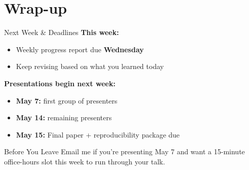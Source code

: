 \section{Wrap-up}

\begin{frame}{Next Week \& Deadlines}
  \small
  \textbf{This week:}
  \begin{itemize}\setlength\itemsep{0pt}
    \item Weekly progress report due \textbf{Wednesday}
    \item Keep revising based on what you learned today
  \end{itemize}

  \textbf{Presentations begin next week:}
  \begin{itemize}\setlength\itemsep{0pt}
    \item \textbf{May 7:} first group of presenters
    \item \textbf{May 14:} remaining presenters
    \item \textbf{May 15:} Final paper + reproducibility package due
  \end{itemize}

  \begin{block}{Before You Leave}
    Email me if you're presenting May 7 and want a 15-minute office-hours slot this week to run through your talk.
  \end{block}
\end{frame}


